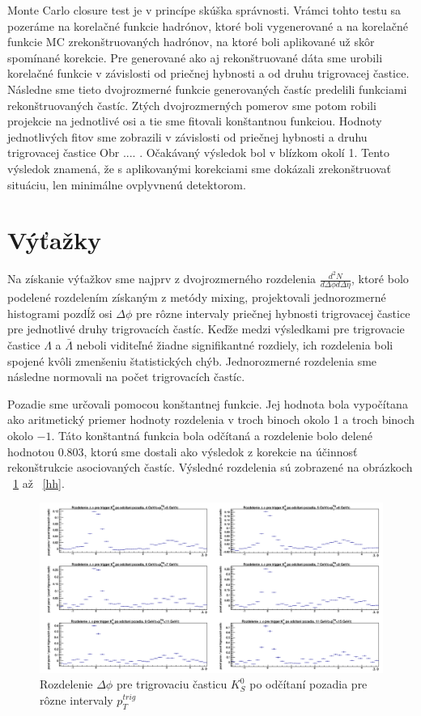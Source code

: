 \documentclass[thesismargins, thesislinespacing]{rnthesis}
\begin{document}
Monte Carlo closure test je v princípe skúška správnosti. Vrámci tohto testu sa pozeráme na korelačné funkcie hadrónov, ktoré boli vygenerované a na korelačné funkcie MC zrekonštruovaných hadrónov, na ktoré boli aplikované už skôr spomínané korekcie. Pre generované ako aj rekonštruované dáta sme urobili korelačné funkcie v závislosti od priečnej hybnosti  a od druhu 
trigrovacej častice. Následne sme tieto dvojrozmerné funkcie generovaných častíc predelili funkciami rekonštruovaných častíc. Ztých dvojrozmerných pomerov sme potom robili projekcie na jednotlivé osi a tie sme fitovali konštantnou funkciou. Hodnoty jednotlivých fitov sme zobrazili v závislosti od priečnej hybnosti a druhu trigrovacej častice Obr .... . Očakávaný výsledok bol v blízkom okolí 1. Tento výsledok znamená, že s aplikovanými korekciami sme dokázali zrekonštruovať situáciu, len minimálne ovplyvnenú detektorom.
\section{Výťažky}

Na získanie výťažkov sme najprv z dvojrozmerného rozdelenia $\frac{d^2N}{d\Delta \phi d\Delta \eta}$, ktoré bolo podelené rozdelením získaným z metódy mixing, projektovali jednorozmerné histogra\-mi pozdĺž osi $\Delta\phi$ pre rôzne intervaly priečnej hybnosti trigrovacej častice pre jednotlivé druhy trigrovacích častíc. Keďže medzi  výsledkami pre trigrovacie častice $\Lambda$ a $\bar{\Lambda}$ neboli viditeľné žiadne signifikantné rozdiely, ich rozdelenia boli spojené kvôli zmenšeniu štatistických chýb. Jednorozmerné rozdelenia sme následne normovali na počet trigrovacích častíc. 

Pozadie sme určovali pomocou konštantnej funkcie. Jej hodnota bola vypočítana ako aritmetický priemer hodnoty rozdelenia v troch binoch okolo 1 a troch binoch okolo $-1$. Táto konštantná funkcia bola odčítaná a rozdelenie bolo delené hodnotou 0.803, ktorú sme dostali ako výsledok z korekcie na účinnosť rekonštrukcie asociovaných častíc. Výsledné rozdelenia sú zobrazené na obrázkoch ~\ref{K0} až ~\ref{hh}. 

\begin{figure}[hbtp!]
	\centering
	\includegraphics[width=\textwidth]{./Obrazky_praca/DeltaPhiKH.png}
	\caption{Rozdelenie $\Delta \phi$ pre trigrovaciu časticu $K^0_S$ po odčítaní pozadia pre rôzne intervaly $p_T^{trig}$}
	\label{K0}
\end{figure}
\end{document}

